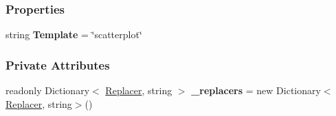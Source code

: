\subsubsection*{Properties}
\begin{DoxyCompactItemize}
\item 
\mbox{\label{classHighcharts_1_1Chart_a5b6ed5b7cf2b4c06fcab23ae89e90697}} 
string {\bfseries Template} = \char`\"{}scatterplot\char`\"{}
\end{DoxyCompactItemize}
\subsubsection*{Private Attributes}
\begin{DoxyCompactItemize}
\item 
\mbox{\label{classHighcharts_1_1Chart_a2f6ad2d7ce597e1ca217d737983ff522}} 
readonly Dictionary$<$ \hyperlink{classHighcharts_1_1Replacer}{Replacer}, string $>$ {\bfseries \+\_\+replacers} = new Dictionary$<$\hyperlink{classHighcharts_1_1Replacer}{Replacer}, string$>$()
\end{DoxyCompactItemize}
